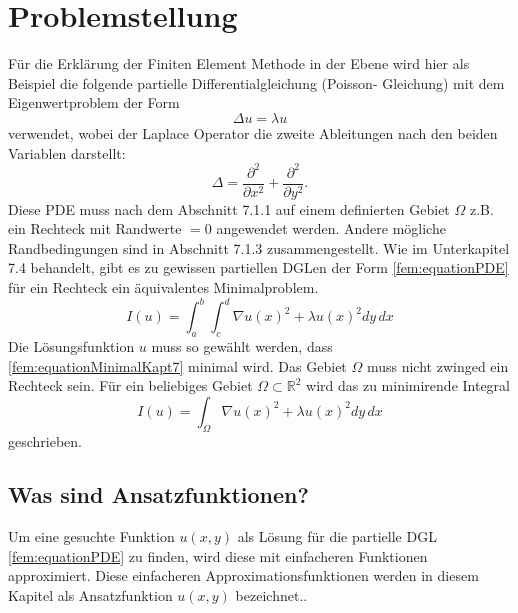 %
%
%
\section{Problemstellung
\label{fem:section:problemstellung}}
Für die Erklärung der Finiten Element Methode in der Ebene wird hier als Beispiel die folgende partielle Differentialgleichung (Poisson- Gleichung) mit dem Eigenwertproblem der Form 
\begin{equation}
	\Delta u = \lambda u
	\label{fem:equationPDE}
\end{equation}
verwendet, wobei der Laplace Operator die zweite Ableitungen nach den beiden Variablen darstellt:
\begin{equation}
	\Delta = \frac{\partial ^2}{\partial x^2} + \frac{\partial ^2}{\partial y^2}.
\end{equation} 
Diese PDE muss nach dem Abschnitt 7.1.1 auf einem definierten Gebiet $\Omega$  z.B. ein Rechteck mit Randwerte $= 0$ angewendet werden. Andere mögliche Randbedingungen sind in Abschnitt 7.1.3 zusammengestellt. Wie im Unterkapitel 7.4 behandelt, gibt es zu gewissen partiellen DGLen der Form \eqref{fem:equationPDE} für ein Rechteck ein äquivalentes Minimalproblem.
\begin{equation}
	I(u) = \int_a^b \int_c^d \nabla u(x)^2 + \lambda u(x)^2 dy \, dx
	\label{fem:equationMinimalKapt7}
\end{equation}
Die Lösungsfunktion $u$ muss so gewählt werden, dass \eqref{fem:equationMinimalKapt7} minimal wird. Das Gebiet $\Omega$ muss nicht zwinged ein Rechteck sein. Für ein beliebiges Gebiet $\Omega \subset \mathbb{R}^2$ wird das zu minimirende Integral  %
\begin{equation}
	I(u) = \int_{\Omega} \nabla u(x)^2 + \lambda u(x)^2 dy \, dx
	\label{fem:equationMinimalKapt7Alg}
\end{equation}
geschrieben.
\subsection{Was sind Ansatzfunktionen?}
Um eine gesuchte Funktion $u(x,y)$ als Lösung für die partielle DGL \eqref{fem:equationPDE} zu finden, wird diese mit einfacheren Funktionen approximiert. Diese einfacheren Approximationsfunktionen werden in diesem Kapitel als Ansatzfunktion $u(x,y)$ bezeichnet..

